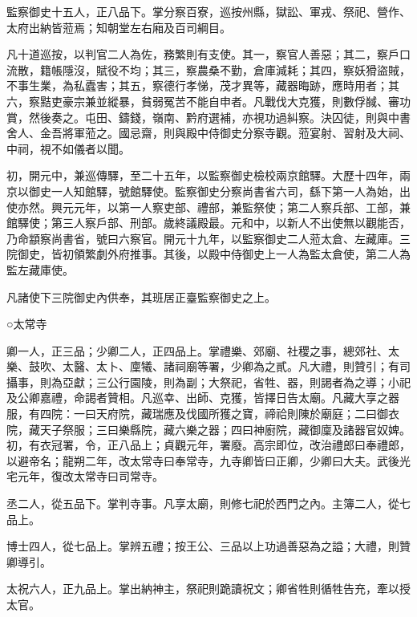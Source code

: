 \begin{pinyinscope}
 監察御史十五人，正八品下。掌分察百寮，巡按州縣，獄訟、軍戎、祭祀、營作、太府出納皆蒞焉；知朝堂左右廂及百司綱目。



 凡十道巡按，以判官二人為佐，務繁則有支使。其一，察官人善惡；其二，察戶口流散，籍帳隱沒，賦役不均；其三，察農桑不勤，倉庫減耗；其四，察妖猾盜賊，不事生業，為私蠹害；其五，察德行孝悌，茂才異等，藏器晦跡，應時用者；其六，察黠吏豪宗兼並縱暴，貧弱冤苦不能自申者。凡戰伐大克獲，則數俘馘、審功賞，然後奏之。屯田、鑄錢，嶺南、黔府選補，亦視功過糾察。決囚徒，則與中書舍人、金吾將軍蒞之。國忌齋，則與殿中侍御史分察寺觀。蒞宴射、習射及大祠、中祠，視不如儀者以聞。



 初，開元中，兼巡傳驛，至二十五年，以監察御史檢校兩京館驛。大歷十四年，兩京以御史一人知館驛，號館驛使。監察御史分察尚書省六司，繇下第一人為始，出使亦然。興元元年，以第一人察吏部、禮部，兼監祭使；第二人察兵部、工部，兼館驛使；第三人察戶部、刑部。歲終議殿最。元和中，以新人不出使無以觀能否，乃命顓察尚書省，號曰六察官。開元十九年，以監察御史二人蒞太倉、左藏庫。三院御史，皆初領繁劇外府推事。其後，以殿中侍御史上一人為監太倉使，第二人為監左藏庫使。



 凡諸使下三院御史內供奉，其班居正臺監察御史之上。



 ○太常寺



 卿一人，正三品；少卿二人，正四品上。掌禮樂、郊廟、社稷之事，總郊社、太樂、鼓吹、太醫、太卜、廩犧、諸祠廟等署，少卿為之貳。凡大禮，則贊引；有司攝事，則為亞獻；三公行園陵，則為副；大祭祀，省牲、器，則謁者為之導；小祀及公卿嘉禮，命謁者贊相。凡巡幸、出師、克獲，皆擇日告太廟。凡藏大享之器服，有四院：一曰天府院，藏瑞應及伐國所獲之寶，禘祫則陳於廟庭；二曰御衣院，藏天子祭服；三曰樂縣院，藏六樂之器；四曰神廚院，藏御廩及諸器官奴婢。初，有衣冠署，令，正八品上；貞觀元年，署廢。高宗即位，改治禮郎曰奉禮郎，以避帝名；龍朔二年，改太常寺曰奉常寺，九寺卿皆曰正卿，少卿曰大夫。武後光宅元年，復改太常寺曰司常寺。



 丞二人，從五品下。掌判寺事。凡享太廟，則修七祀於西門之內。主簿二人，從七品上。



 博士四人，從七品上。掌辨五禮；按王公、三品以上功過善惡為之謚；大禮，則贊卿導引。



 太祝六人，正九品上。掌出納神主，祭祀則跪讀祝文；卿省牲則循牲告充，牽以授太官。




\end{pinyinscope}
